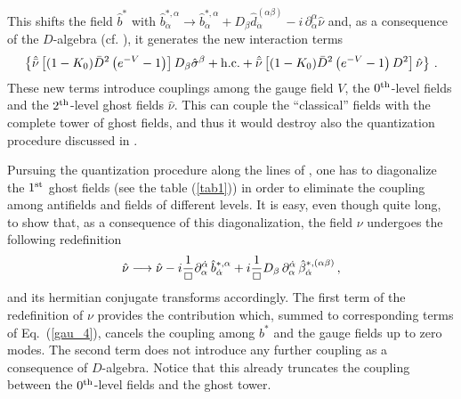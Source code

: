 \documentclass[a4paper,12pt]{article}
\begin{document}
This shifts the field $\hat b^*$ with $ \hat b^{*,
  \alpha}_{\dot\alpha} \longrightarrow \hat b^{*, \alpha}_{\dot\alpha}
+ D_\beta \hat d^{(\alpha\beta)}_{\dot\alpha} - i \,
\partial_{\dot\alpha}^\alpha \hat \nu$ and, as a consequence of the
$D$-algebra (cf. \cite{superspace,GPZ}), it generates the new
interaction terms
\begin{eqnarray}
  \label{gau_5}
\left\{ {\hat{\bar \nu}} \left[ (1 - K_0) \bar D^2  \left( e^{-V} -1
    \right) \right] D_\beta {\hat\sigma}^\beta +{\rm h.c.} +  
{\hat{\bar \nu}} \left[ (1-K_0) \bar D^2  \left( e^{-V} -1 \right) D^2
\right]  {{\hat \nu}} 
\right\}\,. 
\end{eqnarray}
These new terms introduce couplings among the gauge field $V$, the
$0^{\rm th}$-level fields and the $2^{\rm th}$-level ghost fields $\hat
\nu$. This can couple the ``classical'' fields with the complete
tower of ghost fields, and thus it would destroy also the quantization
procedure discussed in \cite{GPZ}.

Pursuing the quantization procedure along the lines of \cite{GPZ}, one
has to diagonalize the $1^{\rm st}$ ghost fields (see the table
(\ref{tab1})) in order to eliminate the coupling among antifields and
fields of different levels. It is easy, even though quite long, to show
that, as a consequence of this diagonalization, the field $\nu$
undergoes the following redefinition
\begin{equation}
  \label{gau_6}
 \hat \nu \longrightarrow \hat\nu  - i {1 \over \Box }
 \partial^{\dot\alpha}_\alpha\, \hat b^{*,\alpha}_{\dot\alpha} +  
i {1 \over \Box } D_\beta  \, \partial^{\dot\alpha}_\alpha\,
\hat\beta^{*,(\alpha\beta)}_{\dot\alpha}\,, 
\end{equation}
and its hermitian conjugate transforms accordingly.
The first term of the redefinition of $\nu$ provides the contribution
which, summed to corresponding terms of Eq.~(\ref{gau_4}), cancels the
coupling among $b^*$ and the gauge fields up to zero modes. The second
term does not introduce any further coupling as a consequence
of $D$-algebra. Notice that this already truncates the coupling
between the $0^{\rm th}$-level fields and the ghost tower.
\end{document}
